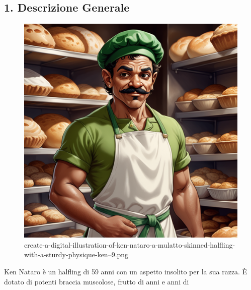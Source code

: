 \subsection{1. Descrizione Generale}\label{descrizione-generale}


\begin{figure}
\centering
\includegraphics{create-a-digital-illustration-of-ken-nataro-a-mulatto-skinned-halfling-with-a-sturdy-physique-ken--9.png}
\caption{create-a-digital-illustration-of-ken-nataro-a-mulatto-skinned-halfling-with-a-sturdy-physique-ken--9.png}
\end{figure}

Ken Nataro è un halfling di 59 anni con un aspetto insolito per la sua
razza. È dotato di potenti braccia muscolose, frutto di anni e anni di
